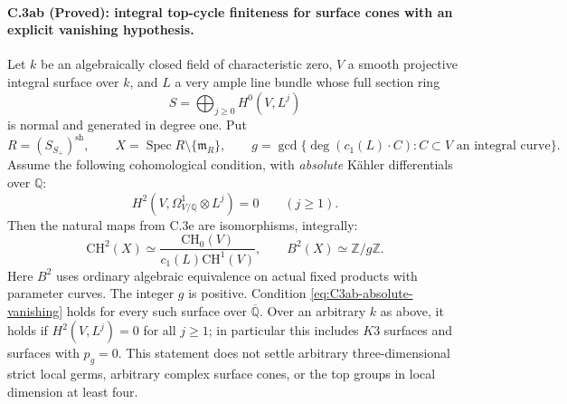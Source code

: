 \paragraph{C.3ab (Proved): integral top-cycle finiteness for surface cones with an explicit vanishing hypothesis.}
Let $k$ be an algebraically closed field of characteristic zero,
$V$ a smooth projective integral surface over $k$, and $L$ a very
ample line bundle whose full section ring
\[
 S=\bigoplus_{j\ge0}H^0(V,L^j)
\]
is normal and generated in degree one. Put
\[
 R=(S_{S_+})^{\mathrm{sh}},\qquad
 X=\operatorname{Spec}R\setminus\{\mathfrak m_R\},\qquad
 g=\gcd\{\deg(c_1(L)\cdot C):C\subset V
                         \text{ an integral curve}\}.
\]
Assume the following cohomological condition, with \emph{absolute}
K\"ahler differentials over $\mathbb Q$:
\begin{equation}\label{eq:C3ab-absolute-vanishing}
 H^2(V,\Omega^1_{V/\mathbb Q}\otimes L^j)=0
                         \qquad(j\ge1).
\end{equation}
Then the natural maps from C.3e are isomorphisms, integrally:
\begin{equation}\label{eq:C3ab-answer}
 \mathrm{CH}^2(X)\simeq
 \frac{\mathrm{CH}_0(V)}{c_1(L)\mathrm{CH}^1(V)},
 \qquad
 B^2(X)\simeq\mathbb Z/g\mathbb Z.
\end{equation}
Here $B^2$ uses ordinary algebraic equivalence on actual fixed
products with parameter curves. The integer $g$ is positive.
Condition \eqref{eq:C3ab-absolute-vanishing} holds for every such
surface over $\overline{\mathbb Q}$. Over an arbitrary $k$ as above,
it holds if $H^2(V,L^j)=0$ for all $j\ge1$; in particular this
includes $K3$ surfaces and surfaces with $p_g=0$.
This statement does not settle arbitrary three-dimensional
strict local germs, arbitrary complex surface cones, or the top
groups in local dimension at least four.

